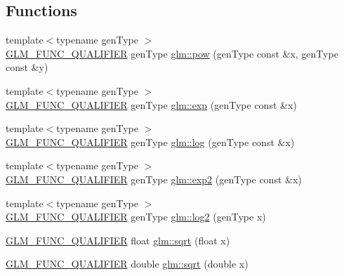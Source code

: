 \subsection*{Functions}
\begin{DoxyCompactItemize}
\item 
{\footnotesize template$<$typename gen\+Type $>$ }\\\hyperlink{setup_8hpp_a33fdea6f91c5f834105f7415e2a64407}{G\+L\+M\+\_\+\+F\+U\+N\+C\+\_\+\+Q\+U\+A\+L\+I\+F\+I\+ER} gen\+Type \hyperlink{group__core__func__exponential_ga1ce4b2fddd26d0d3a35a8d98f37f3ac0}{glm\+::pow} (gen\+Type const \&x, gen\+Type const \&y)
\item 
{\footnotesize template$<$typename gen\+Type $>$ }\\\hyperlink{setup_8hpp_a33fdea6f91c5f834105f7415e2a64407}{G\+L\+M\+\_\+\+F\+U\+N\+C\+\_\+\+Q\+U\+A\+L\+I\+F\+I\+ER} gen\+Type \hyperlink{group__core__func__exponential_gae154699ba6bda068d4b87cf9b987381f}{glm\+::exp} (gen\+Type const \&x)
\item 
{\footnotesize template$<$typename gen\+Type $>$ }\\\hyperlink{setup_8hpp_a33fdea6f91c5f834105f7415e2a64407}{G\+L\+M\+\_\+\+F\+U\+N\+C\+\_\+\+Q\+U\+A\+L\+I\+F\+I\+ER} gen\+Type \hyperlink{group__core__func__exponential_ga0c8da2d2921da250e8700ac4476916a1}{glm\+::log} (gen\+Type const \&x)
\item 
{\footnotesize template$<$typename gen\+Type $>$ }\\\hyperlink{setup_8hpp_a33fdea6f91c5f834105f7415e2a64407}{G\+L\+M\+\_\+\+F\+U\+N\+C\+\_\+\+Q\+U\+A\+L\+I\+F\+I\+ER} gen\+Type \hyperlink{group__core__func__exponential_gac45997fb3ac907cad408d6da0a0f5f54}{glm\+::exp2} (gen\+Type const \&x)
\item 
{\footnotesize template$<$typename gen\+Type $>$ }\\\hyperlink{setup_8hpp_a33fdea6f91c5f834105f7415e2a64407}{G\+L\+M\+\_\+\+F\+U\+N\+C\+\_\+\+Q\+U\+A\+L\+I\+F\+I\+ER} gen\+Type \hyperlink{group__core__func__exponential_gad41e336e9bc8190fe99d2cfd9261c19b}{glm\+::log2} (gen\+Type x)
\item 
\hyperlink{setup_8hpp_a33fdea6f91c5f834105f7415e2a64407}{G\+L\+M\+\_\+\+F\+U\+N\+C\+\_\+\+Q\+U\+A\+L\+I\+F\+I\+ER} float \hyperlink{namespaceglm_aef7d852d92e7b9e556300aaf14863741}{glm\+::sqrt} (float x)
\item 
\hyperlink{setup_8hpp_a33fdea6f91c5f834105f7415e2a64407}{G\+L\+M\+\_\+\+F\+U\+N\+C\+\_\+\+Q\+U\+A\+L\+I\+F\+I\+ER} double \hyperlink{namespaceglm_a71f6d03bb8b54de18812b782194f6ac5}{glm\+::sqrt} (double x)

\end{DoxyCompactItemize}
